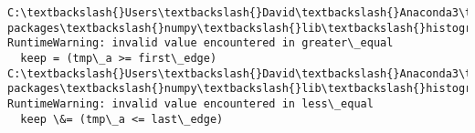 \documentclass[11pt]{article}
\begin{document}
    \begin{Verbatim}[commandchars=\\\{\}]
C:\textbackslash{}Users\textbackslash{}David\textbackslash{}Anaconda3\textbackslash{}lib\textbackslash{}site-packages\textbackslash{}numpy\textbackslash{}lib\textbackslash{}histograms.py:824: RuntimeWarning: invalid value encountered in greater\_equal
  keep = (tmp\_a >= first\_edge)
C:\textbackslash{}Users\textbackslash{}David\textbackslash{}Anaconda3\textbackslash{}lib\textbackslash{}site-packages\textbackslash{}numpy\textbackslash{}lib\textbackslash{}histograms.py:825: RuntimeWarning: invalid value encountered in less\_equal
  keep \&= (tmp\_a <= last\_edge)

    \end{Verbatim}

    \begin{center}
    \end{center}
    { \hspace*{\fill} \\}
    
\end{document}

